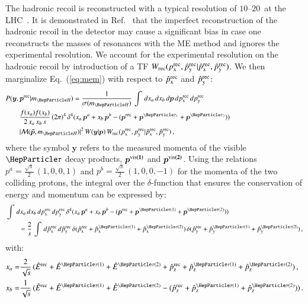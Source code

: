 The hadronic recoil is reconstructed with a typical resolution of $10$--$20$~\GeV at the LHC~\cite{CMS-JME-13-003,ATLAS-CONF-2014-019}.
It is demonstrated in Ref.~\cite{Alwall:2010cq} that the imperfect reconstruction of the hadronic recoil
in the detector may cause a significant bias in case one reconstructs the masses of resonances
with the ME method and ignores the experimental resolution. We account
for the experimental resolution on the hadronic recoil by introduction
of a TF $W_{\textrm{rec}}( p_{\textrm{x}}^{\textrm{rec}}, \hat{p}_{\textrm{y}}^{\textrm{rec}} | \hat{p}_{\textrm{x}}^{\textrm{rec}},
\hat{p}_{\textrm{y}}^{\textrm{rec}} )$.
We then marginalize Eq.~(\ref{eq:mem}) with respect to $\hat{p}_{\textrm{x}}^{\textrm{rec}}$ and $\hat{p}_{\textrm{y}}^{\textrm{rec}}$:
\begin{align}
& P(\bm{y},\bm{p}^{\rec}|m_{\PHiggs}) =
\frac{1}{\sigma(m_{\PHiggs})} \, \int \, dx_{a} \, dx_{b} \, d\bm{p} \,
d\pX^{\rec} \, d\pY^{\rec} \, \hspace{5cm} \nonumber \\
& \qquad \frac{f(x_{a}) f(x_{b})}{2 \, x_{a} \, x_{b} \, s} \,  (2\pi)^{4} \, \delta^{4}( x_{a} \, \bm{p}^{a} + x_{b} \, \bm{p}^{b} - (\bm{p}^{\rec} + \bm{p}^{\Pgt_{1}} + \bm{p}^{\Pgt_{2}}) ) \, 
       \nonumber \\
& \qquad \vert \mathcal{M}(\bm{\tilde{p}},m_{\PHiggs}) \vert^{2} \, W(\bm{y}|\bm{p}) \, W_{\rec}( \pX^{\rec}, \pY^{\rec} | \pXhat^{\rec}, \pYhat^{\rec} ) \, ,
\label{eq:mem_mod_hadRecoil}
\end{align}
where the symbol $\bm{y}$ refers to the measured momenta of the visible $\Pgt$ decay products, $\bm{p^{\textrm{vis}(1)}}$ and $\bm{p^{\textrm{vis}(2)}}$.
Using the relations $p^{a} = \frac{\sqrt{s}}{2} \, (1, 0, 0, 1)$ and $p^{b} = \frac{\sqrt{s}}{2} \, (1, 0, 0, -1)$ for the momenta of the two colliding protons,
the integral over the $\delta$-function that ensures the conservation of energy and momentum can be expressed by:
\begin{align}
& \int \, dx_{a} \, dx_{b} \, d\pX^{\rec} \, d\pY^{\rec} \, \delta^{4}(
x_{a} \, \bm{p}^{a} + x_{b} \, \bm{p}^{b} - (\bm{p}^{\rec} +
\bm{p}^{\Pgt(1)} + \bm{p}^{\Pgt(2)})) \nonumber \\
& \qquad = \frac{2}{s} \, \int \,
d\pXhat^{\rec} \, d\pYhat^{\rec} \, 
\delta( \pXhat^{\rec} + \pXhat^{\Pgt(1)} + \pXhat^{\Pgt(2)} ) \,
\delta( \pYhat^{\rec} + \pYhat^{\Pgt(1)} + \pYhat^{\Pgt(2)} ) \, ,
\label{eq:delta4}
\end{align}
with:
\begin{align}
x_{a} = & \frac{2}{\sqrt{s}} \, (\Ehat^{\rec} + \Ehat^{\Pgt(1)} +
\Ehat^{\Pgt(2)} + \pZhat^{\rec} + \pZhat^{\Pgt(1)} + \pZhat^{\Pgt(2)})
\, , \nonumber \\
x_{b} = & \frac{1}{\sqrt{s}} \, (\Ehat^{\rec} + \Ehat^{\Pgt(1)} + \Ehat^{\Pgt(2)} - (\pZhat^{\rec} + \pZhat^{\Pgt(1)} + \pZhat^{\Pgt(2)})) \, .
\label{eq:xa_and_xb}
\end{align}
